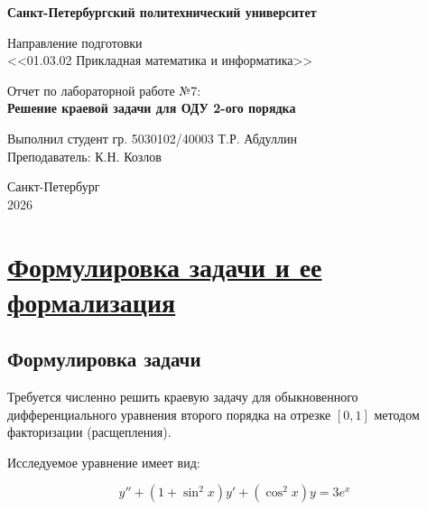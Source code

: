 \documentclass[14pt]{extarticle}
\begin{document}
	
	\thispagestyle{empty}
	
	\begin{center}
		
		\textbf{Санкт-Петербургский политехнический университет}\\
		\vspace{2cm}
		
		Направление подготовки \\
		\large <<01.03.02 Прикладная математика и информатика>>\\
		
		\vspace{7cm}
		
		Отчет по лабораторной работе №7:\\
		\vspace{0.2cm}
		\textbf{\LARGE Решение краевой задачи для ОДУ 2-ого порядка}
		
		\vspace{6cm}
		
		\begin{flushleft}
			Выполнил студент гр. 5030102/40003 \hfill Т.Р. Абдуллин\\
			Преподаватель: \hfill К.Н. Козлов\\
		\end{flushleft}
		
		\vspace{3cm}
		
		Санкт-Петербург\\
		2026
	\end{center}
	
	
	\tableofcontents
	
	\newpage
	\section{\Large \underline{Формулировка задачи и ее формализация}}
	\subsection{Формулировка задачи}
	
	Требуется численно решить краевую задачу для обыкновенного
	дифференциального уравнения второго порядка на отрезке $[0, 1]$
	методом факторизации (расщепления).
	
	Исследуемое уравнение имеет вид:
	
	\[
	y'' + (1 + \sin^2 x)y' + (\cos^2 x)y = 3e^x
	\]
	
\end{document}
